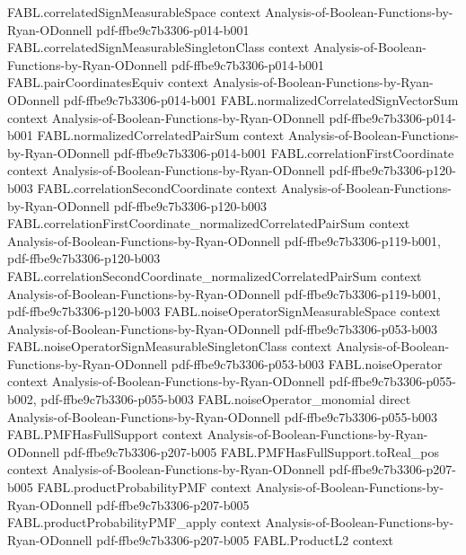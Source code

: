 \begin{theorem}
\proofstep
  {FABL.correlatedSignMeasurableSpace}
  {context}
  {Analysis-of-Boolean-Functions-by-Ryan-ODonnell}
  {pdf-ffbe9c7b3306-p014-b001}
\proofstep
  {FABL.correlatedSignMeasurableSingletonClass}
  {context}
  {Analysis-of-Boolean-Functions-by-Ryan-ODonnell}
  {pdf-ffbe9c7b3306-p014-b001}
\proofstep
  {FABL.pairCoordinatesEquiv}
  {context}
  {Analysis-of-Boolean-Functions-by-Ryan-ODonnell}
  {pdf-ffbe9c7b3306-p014-b001}
\proofstep
  {FABL.normalizedCorrelatedSignVectorSum}
  {context}
  {Analysis-of-Boolean-Functions-by-Ryan-ODonnell}
  {pdf-ffbe9c7b3306-p014-b001}
\proofstep
  {FABL.normalizedCorrelatedPairSum}
  {context}
  {Analysis-of-Boolean-Functions-by-Ryan-ODonnell}
  {pdf-ffbe9c7b3306-p014-b001}
\proofstep
  {FABL.correlationFirstCoordinate}
  {context}
  {Analysis-of-Boolean-Functions-by-Ryan-ODonnell}
  {pdf-ffbe9c7b3306-p120-b003}
\proofstep
  {FABL.correlationSecondCoordinate}
  {context}
  {Analysis-of-Boolean-Functions-by-Ryan-ODonnell}
  {pdf-ffbe9c7b3306-p120-b003}
\proofstep
  {FABL.correlationFirstCoordinate_normalizedCorrelatedPairSum}
  {context}
  {Analysis-of-Boolean-Functions-by-Ryan-ODonnell}
  {pdf-ffbe9c7b3306-p119-b001,
    pdf-ffbe9c7b3306-p120-b003}
\proofstep
  {FABL.correlationSecondCoordinate_normalizedCorrelatedPairSum}
  {context}
  {Analysis-of-Boolean-Functions-by-Ryan-ODonnell}
  {pdf-ffbe9c7b3306-p119-b001,
    pdf-ffbe9c7b3306-p120-b003}
\proofstep
  {FABL.noiseOperatorSignMeasurableSpace}
  {context}
  {Analysis-of-Boolean-Functions-by-Ryan-ODonnell}
  {pdf-ffbe9c7b3306-p053-b003}
\proofstep
  {FABL.noiseOperatorSignMeasurableSingletonClass}
  {context}
  {Analysis-of-Boolean-Functions-by-Ryan-ODonnell}
  {pdf-ffbe9c7b3306-p053-b003}
\proofstep
  {FABL.noiseOperator}
  {context}
  {Analysis-of-Boolean-Functions-by-Ryan-ODonnell}
  {pdf-ffbe9c7b3306-p055-b002,
    pdf-ffbe9c7b3306-p055-b003}
\proofstep
  {FABL.noiseOperator_monomial}
  {direct}
  {Analysis-of-Boolean-Functions-by-Ryan-ODonnell}
  {pdf-ffbe9c7b3306-p055-b003}
\proofstep
  {FABL.PMFHasFullSupport}
  {context}
  {Analysis-of-Boolean-Functions-by-Ryan-ODonnell}
  {pdf-ffbe9c7b3306-p207-b005}
\proofstep
  {FABL.PMFHasFullSupport.toReal_pos}
  {context}
  {Analysis-of-Boolean-Functions-by-Ryan-ODonnell}
  {pdf-ffbe9c7b3306-p207-b005}
\proofstep
  {FABL.productProbabilityPMF}
  {context}
  {Analysis-of-Boolean-Functions-by-Ryan-ODonnell}
  {pdf-ffbe9c7b3306-p207-b005}
\proofstep
  {FABL.productProbabilityPMF_apply}
  {context}
  {Analysis-of-Boolean-Functions-by-Ryan-ODonnell}
  {pdf-ffbe9c7b3306-p207-b005}
\proofstep
  {FABL.ProductL2}
  {context}

\end{theorem}

